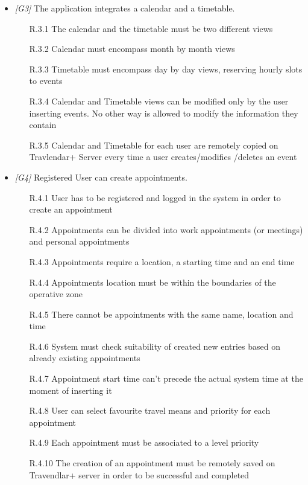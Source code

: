 \begin{itemize}
                  
\item \textit{[G3]} The application integrates a calendar and a timetable.

                  \begin{itemize}
                  
                  \item [R.3.1] The calendar and the timetable must be two different views 
                  \item [R.3.2] Calendar must encompass month by month views
                  \item [R.3.3] Timetable must encompass day by day views, reserving hourly slots to events
                  \item [R.3.4] Calendar and Timetable views can be modified only by the user inserting events. No other way is allowed to modify the information they contain
                  \item [R.3.5] Calendar and Timetable for each user are remotely copied on Travlendar+ Server every time a user creates/modifies /deletes an event
                        
                  \end{itemize}
                  
\item \textit{[G4]} Registered User can create appointments.

 \begin{itemize}
                        \item [R.4.1] User has to be registered and logged in the system in order to create an
appointment
                        \item [R.4.2] Appointments can be divided into work appointments (or meetings) and personal appointments
                        \item [R.4.3] Appointments require a location, a starting time and an end time
                        \item [R.4.4] Appointments location must be within the boundaries of the operative zone
                        \item [R.4.5] There cannot be appointments with the same name, location and time
                        \item [R.4.6] System must check suitability of created new entries based on already existing appointments
                        \item [R.4.7] Appointment start time can't precede the actual system time at the moment of inserting it                                 														\item [R.4.8] User can select favourite travel means and priority for each appointment
                        \item [R.4.9] Each appointment must be associated to a level priority
                        \item [R.4.10] The creation of an appointment must be remotely saved on Travendlar+ server in order to be successful and completed
                        

\end{itemize}
\end{itemize}
